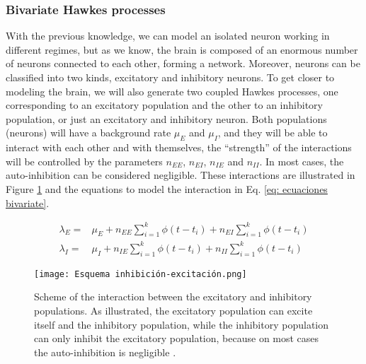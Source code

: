 \subsubsection{Bivariate Hawkes processes} \label{subsubsec:Coupled_Hawkes_processes}
With the previous knowledge, we can model an isolated neuron working in different regimes, but as we know, the brain is composed of an enormous number of neurons connected to each 
other, forming a network. Moreover, neurons can be classified into two kinds, excitatory and inhibitory neurons. To get closer to modeling the brain, we will also generate two coupled
Hawkes processes, one corresponding to an excitatory population and the other to an inhibitory population, or just an excitatory and inhibitory neuron. 
Both populations (neurons) will have a background rate  $\mu_E$ and $\mu_I$, and they will be able to interact with each other and with themselves, the ``strength'' of the interactions 
will be controlled by the parameters $n_{EE}$, $n_{EI}$, $n_{IE}$ and $n_{II}$. In most cases, the auto-inhibition can be considered negligible. 
These interactions are illustrated in Figure \ref{f: Hawkes coupled} and the equations to model the interaction in Eq. \ref{eq: ecuaciones bivariate}.

\begin{equation}
    \begin{split}
        \lambda_E =& \mu_E + n_{EE}\sum_{i=1}^{k}\phi(t-t_i) + n_{EI}\sum_{i=1}^{k}\phi(t-t_i)\\
        \lambda_I =& \mu_I + n_{IE}\sum_{i=1}^{k}\phi(t-t_i) + n_{II}\sum_{i=1}^{k}\phi(t-t_i)
    \end{split}
    \label{eq: ecuaciones bivariate}
\end{equation}

\begin{figure}[H]
\centering
\texttt{[image: Esquema inhibición-excitación.png]}
\caption{Scheme of the interaction between the excitatory and inhibitory populations. As illustrated, the excitatory population can excite itself and the inhibitory population, while the
inhibitory population can only inhibit the excitatory population, because on most cases the auto-inhibition is negligible \cite{kalle2018growing}.}
\label{f: Hawkes coupled}
\end{figure}
